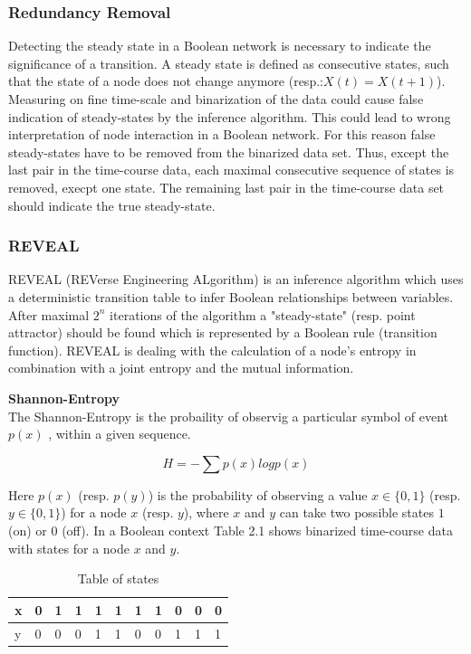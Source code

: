 \subsubsection*{Redundancy Removal}
Detecting the steady state in a Boolean network is necessary to indicate the significance of a transition. A steady state is defined as consecutive states, such that the state of a node does not change anymore (resp.:$X(t)=X(t+1)$). Measuring on fine time-scale and binarization of the data could cause false indication of steady-states by the inference algorithm. This could lead to wrong interpretation of node interaction in a Boolean network. For this reason false steady-states have to be removed from the binarized data set. Thus, except the last pair in the time-course data, each maximal consecutive sequence of states is removed, execpt one state. The remaining last pair in the time-course data set should indicate the true steady-state.

\subsubsection*{REVEAL}
REVEAL (REVerse Engineering ALgorithm) is an inference algorithm which uses a deterministic transition table to infer Boolean relationships between variables. After maximal $2^n$ iterations of the algorithm a "steady-state" (\gls{resp.} point attractor) should be found which is represented by a Boolean rule (transition function). REVEAL is dealing with the calculation of a node's entropy in combination with a joint entropy and the mutual information. \\

\begin{defn}\textbf{Shannon-Entropy}\\
The Shannon-Entropy is the probaility of observig a particular symbol of event $p(x)$ , within a given sequence.
\begin{center}
\begin{equation}
H=-\sum p(x)log p(x)
\end{equation}
\end{center}
\end{defn}


\begin{exmp}
Here $p(x)$ (resp. $p(y)$) is the probability of observing a value $x\in \{0,1\}$ (resp. $y\in \{0,1\}$) for a node $x$ (resp. $y$),  where $x$ and $y$ can take two possible states $1$ (on) or $0$ (off). In a Boolean context Table 2.1 shows binarized time-course data with states for a node $x$ and $y$.\end{exmp}
\begin{table}[H]
\begin{center}
\begin{tabular}{l|llllllllll}
x & 0 & 1 & 1 & 1 & 1 & 1 & 1 & 0 & 0 & 0\\
\hline
y & 0 & 0 & 0 & 1 & 1 & 0 & 0 & 1 & 1 & 1\\
\end{tabular}
\caption{Table of states}
\end{center}
\end{table}


